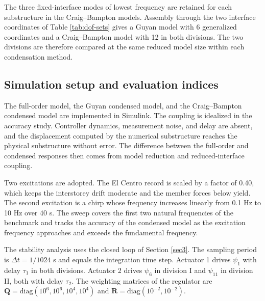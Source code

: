 \documentclass[a4paper,fleqn,review,12pt]{cas-sc}
\numberwithin{equation}{section}
\begin{document}
The three fixed-interface modes of lowest frequency are retained for each substructure in the Craig--Bampton models. Assembly through the two interface coordinates of Table \ref{tab:dof-sets} gives a Guyan model with 6 generalized coordinates and a Craig--Bampton model with 12 in both divisions. The two divisions are therefore compared at the same reduced model size within each condensation method.

\subsection{Simulation setup and evaluation indices}
\label{sec:setup}

The full-order model, the Guyan condensed model, and the Craig--Bampton condensed model are implemented in Simulink. The coupling is idealized in the accuracy study. Controller dynamics, measurement noise, and delay are absent, and the displacement computed by the numerical substructure reaches the physical substructure without error. The difference between the full-order and condensed responses then comes from model reduction and reduced-interface coupling.

Two excitations are adopted. The El Centro record is scaled by a factor of 0.40, which keeps the interstorey drift moderate and the member forces below yield. The second excitation is a chirp whose frequency increases linearly from 0.1 Hz to 10 Hz over 40 s. The sweep covers the first two natural frequencies of the benchmark and tracks the accuracy of the condensed model as the excitation frequency approaches and exceeds the fundamental frequency.

The stability analysis uses the closed loop of Section \ref{sec3}. The sampling period is \(\Delta t=1/1024\) s and equals the integration time step. Actuator 1 drives \(\psi_{1}\) with delay \(\tau_{1}\) in both divisions. Actuator 2 drives \(\psi_{6}\) in division I and \(\psi_{11}\) in division II, both with delay \(\tau_{2}\). The weighting matrices of the regulator are \(\mathbf{Q}=\mathrm{diag}(10^{6},10^{6},10^{4},10^{4})\) and \(\mathbf{R}=\mathrm{diag}(10^{-2},10^{-2})\).
\end{document}
